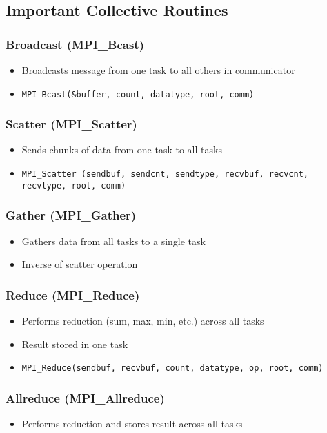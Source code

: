 \documentclass[12pt]{article}
\begin{document}
\subsection{Important Collective Routines}

\subsubsection{Broadcast (MPI\_Bcast)}
\begin{itemize}
    \item Broadcasts message from one task to all others in communicator
    \item \texttt{MPI\_Bcast(\&buffer, count, datatype, root, comm)}
\end{itemize}

\subsubsection{Scatter (MPI\_Scatter)}
\begin{itemize}
    \item Sends chunks of data from one task to all tasks
    \item \texttt{MPI\_Scatter (sendbuf, sendcnt, sendtype, recvbuf, recvcnt, recvtype, root, comm)}
\end{itemize}

\subsubsection{Gather (MPI\_Gather)}
\begin{itemize}
    \item Gathers data from all tasks to a single task
    \item Inverse of scatter operation
\end{itemize}

\subsubsection{Reduce (MPI\_Reduce)}
\begin{itemize}
    \item Performs reduction (sum, max, min, etc.) across all tasks
    \item Result stored in one task
    \item \texttt{MPI\_Reduce(sendbuf, recvbuf, count, datatype, op, root, comm)}
\end{itemize}

\subsubsection{Allreduce (MPI\_Allreduce)}
\begin{itemize}
    \item Performs reduction and stores result across all tasks
\end{itemize}
\end{document}
